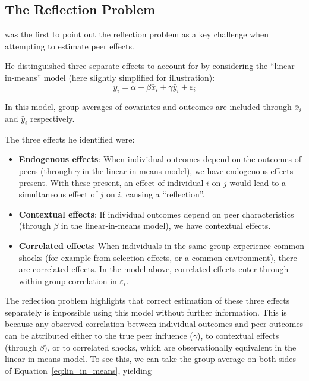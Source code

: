 \subsection{The Reflection Problem}

\textcite[Sec.~2]{Manski1993} was the first to point out the reflection problem as a key challenge when attempting to estimate peer effects.

He distinguished three separate effects to account for by considering the ``linear-in-means'' model (here slightly simplified for illustration):
\begin{equation}
    \label{eq:lin_in_means}
    y_i = \alpha + \beta \bar{x}_i + \gamma \bar{y}_i + \varepsilon_i
\end{equation}

In this model, group averages of covariates and outcomes are included through $\bar{x}_i$ and $\bar{y}_i$ respectively.

The three effects he identified were:
\begin{itemize}
    \item \textbf{Endogenous effects}: When individual outcomes depend on the outcomes of peers (through $\gamma$ in the linear-in-means model), we have endogenous effects present. With these present, an effect of individual $i$ on $j$ would lead to a simultaneous effect of $j$ on $i$, causing a ``reflection''.
    \item \textbf{Contextual effects}: If individual outcomes depend on peer characteristics (through $\beta$ in the linear-in-means model), we have contextual effects.
    \item \textbf{Correlated effects}: When individuals in the same group experience common shocks (for example from selection effects, or a common environment), there are correlated effects. In the model above, correlated effects enter through within-group correlation in $\varepsilon_i$.
\end{itemize}

The reflection problem highlights that correct estimation of these three effects separately is impossible using this model without further information. This is because any observed correlation between individual outcomes and peer outcomes can be attributed either to the true peer influence ($\gamma$), to contextual effects (through $\beta$), or to correlated shocks, which are observationally equivalent in the linear-in-means model. To see this, we can take the group average on both sides of Equation~\eqref{eq:lin_in_means}, yielding

